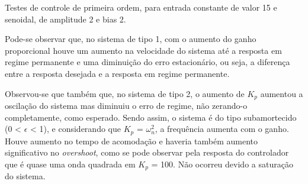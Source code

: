 Testes de controle de primeira ordem, para entrada constante de valor 15 e senoidal, de amplitude 2 e bias 2.

Pode-se observar que, no sistema de tipo 1, com o aumento do ganho proporcional houve um
aumento na velocidade do sistema até a resposta em regime permanente e
uma diminuição do erro estacionário, ou seja,
a diferença entre a resposta desejada e a resposta em regime permanente.

Observou-se que também que, no sistema de tipo 2,
o aumento de $K_p$ aumentou a oscilação do sistema mas diminuiu o 
erro de regime, não zerando-o completamente, como esperado. Sendo assim,
o sistema é do tipo subamortecido (0 < $\epsilon$ < 1), e considerando
que $K_p$ = $\omega_n^2$, a frequência aumenta com o ganho. Houve aumento
no tempo de acomodação e haveria também aumento significativo no
\emph{overshoot}, como se pode observar pela resposta do controlador
que é quase uma onda quadrada em $K_p$ = 100.
Não ocorreu devido a saturação do sistema.
